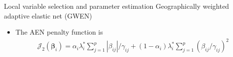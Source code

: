 \documentclass[12pt,t]{beamer}
\newcommand{\subt}[1]{{\footnotesize \color{subtitle} {#1}}}
\begin{document}
\begin{frame}{Local variable selection and  parameter estimation}
\subt{Geographically weighted adaptive elastic net (GWEN)}

\bigskip
\begin{itemize}
  \item The AEN penalty function is
  \begin{align*}
    \mathcal{J}_2(\bm{\beta}_i) = \alpha_i \lambda^*_i \sum_{j=1}^p |\beta_{ij}| / \gamma_{ij} + (1-\alpha_i) \lambda^*_i \sum_{j=1}^p  \left( \beta_{ij} / \gamma_{ij} \right)^2
  \end{align*}
\end{itemize}

\end{frame}














\begin{comment}
\begin{frame}{Local variable selection and  parameter estimation}
\subt{Bandwidth parameter estimation}

\bigskip
Letting $H_i = \bm{W}_i \bm{X}\left(\bm{X}'\bm{W}_i\bm{X}\right)^{-1}\bm{X}'$, where $\bm{W}_i$ is the diagonal weight matrix diag$(w_{ii'})$,
 
\begin{align*}
  \hat{\bm{y}} = \bm{H} \bm{y}
\end{align*}

\note{note}
\end{frame}
\end{comment}
\end{document}
